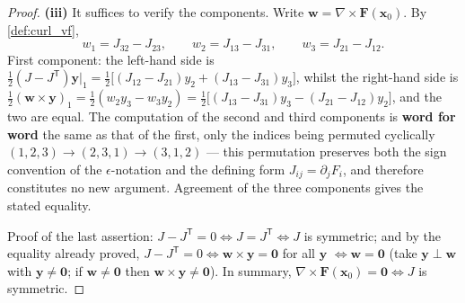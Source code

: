 \begin{proof}
\textbf{(iii)} It suffices to verify the components. Write $\mathbf w = \nabla\times\mathbf F(\mathbf x_0)$. By \cref{def:curl_vf},
\[
w_1 = J_{32}-J_{23},\qquad w_2 = J_{13}-J_{31},\qquad w_3 = J_{21}-J_{12}.
\]
First component: the left-hand side is $\tfrac12(J-J^{\mathsf T})\mathbf y\big|_1 = \tfrac12\bigl[(J_{12}-J_{21})y_2+(J_{13}-J_{31})y_3\bigr]$, whilst the right-hand side is $\tfrac12(\mathbf w\times\mathbf y)_1 = \tfrac12(w_2y_3-w_3y_2) = \tfrac12\bigl[(J_{13}-J_{31})y_3-(J_{21}-J_{12})y_2\bigr]$, and the two are equal. The computation of the second and third components is \textbf{word for word} the same as that of the first, only the indices being permuted cyclically $(1,2,3)\to(2,3,1)\to(3,1,2)$ --- this permutation preserves both the sign convention of the $\epsilon$-notation and the defining form $J_{ij}=\partial_jF_i$, and therefore constitutes no new argument. Agreement of the three components gives the stated equality.

Proof of the last assertion: $J-J^{\mathsf T}=0 \iff J=J^{\mathsf T}\iff J$ is symmetric; and by the equality already proved, $J-J^{\mathsf T}=0 \iff \mathbf w\times\mathbf y=\mathbf 0$ for all $\mathbf y$ $\iff \mathbf w=\mathbf 0$ (take $\mathbf y\perp\mathbf w$ with $\mathbf y\ne\mathbf 0$; if $\mathbf w\ne\mathbf 0$ then $\mathbf w\times\mathbf y\ne\mathbf 0$). In summary, $\nabla\times\mathbf F(\mathbf x_0)=\mathbf 0 \iff J$ is symmetric.
\end{proof}

